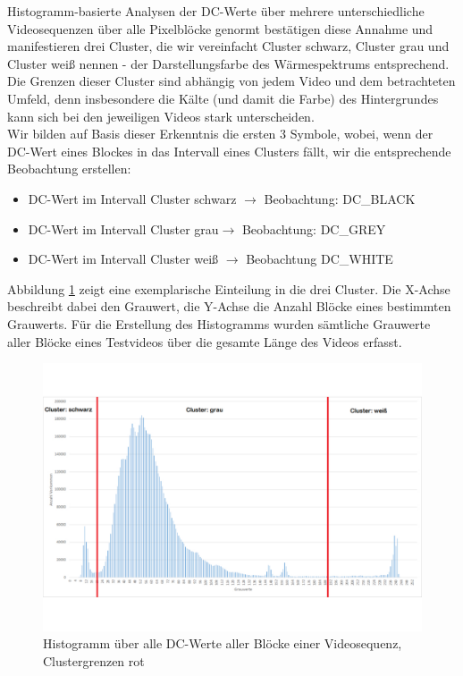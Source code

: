 Histogramm-basierte Analysen der DC-Werte über mehrere unterschiedliche Videosequenzen über alle Pixelblöcke genormt bestätigen diese Annahme und manifestieren drei Cluster, die wir vereinfacht Cluster schwarz, Cluster grau und Cluster weiß nennen - der Darstellungsfarbe des Wärmespektrums entsprechend.
Die Grenzen dieser Cluster sind abhängig von jedem Video und dem betrachteten Umfeld, denn insbesondere die Kälte (und damit die Farbe) des Hintergrundes kann sich bei den jeweiligen Videos stark unterscheiden.\\
Wir bilden auf Basis dieser Erkenntnis die ersten 3 Symbole, wobei, wenn der DC-Wert eines Blockes in das Intervall eines Clusters fällt, wir die entsprechende Beobachtung erstellen:
\begin{itemize}
	\item DC-Wert im Intervall Cluster schwarz $\rightarrow$ Beobachtung: DC\_BLACK
	\item DC-Wert im Intervall Cluster grau$\rightarrow$ Beobachtung: DC\_GREY
	\item DC-Wert im Intervall Cluster weiß $\rightarrow$ Beobachtung DC\_WHITE
\end{itemize}
Abbildung \ref{fig:histogram} zeigt eine exemplarische Einteilung in die drei Cluster.
Die X-Achse beschreibt dabei den Grauwert, die Y-Achse die Anzahl Blöcke eines bestimmten Grauwerts.
Für die Erstellung des Histogramms wurden sämtliche Grauwerte aller Blöcke eines Testvideos über die gesamte Länge des Videos erfasst.
\begin{figure}[H]
	\centering
	\includegraphics[trim=0cm 3cm 0cm 3cm, clip=true,width=1\textwidth]{bilder/04_histogram_cluster.pdf}
	\caption{Histogramm über alle DC-Werte aller Blöcke einer Videosequenz, Clustergrenzen rot}
	\label{fig:histogram}
\end{figure}

